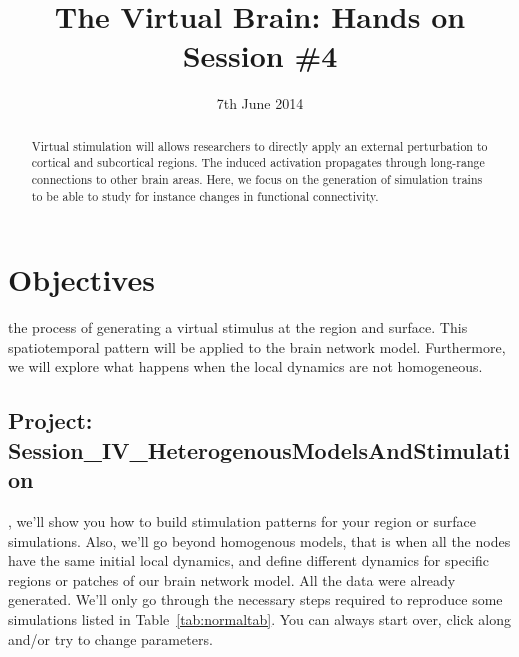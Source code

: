 \documentclass{tufte-handout}
\title{The Virtual Brain: Hands on Session \#4}
\date{7th June 2014}
\begin{document}

\newpage
\ClearWallPaper
\begin{abstract}
\noindent Virtual stimulation will allows researchers to directly apply an external perturbation to cortical and subcortical regions. The induced activation propagates through long-range
connections to other brain areas. Here, we focus on the generation of
simulation trains to be able to study for instance changes in
functional connectivity.  

\begin{marginfigure}%
  \label{fig:marginfig}
\end{marginfigure}
\end{abstract}


\section{Objectives}\label{sec:objectives}

 the process of generating a virtual stimulus at the
region and surface. This spatiotemporal pattern will be applied to the brain network model.
Furthermore, we will explore what happens when the local dynamics are not homogeneous.


\subsection{Project: Session\_IV\_HeterogenousModelsAndStimulation}\label{sec:project_data}

, we'll show you how to build stimulation patterns for your region or surface simulations. Also, we'll go beyond homogenous models, that is when all the nodes have the same initial local dynamics,  and define different dynamics for specific regions or patches of our brain network model. 
All the data were already generated. We'll only go through the necessary steps required to reproduce some simulations listed in Table~\ref{tab:normaltab}. You can always start over, click along and/or try to change parameters.
\end{document}
